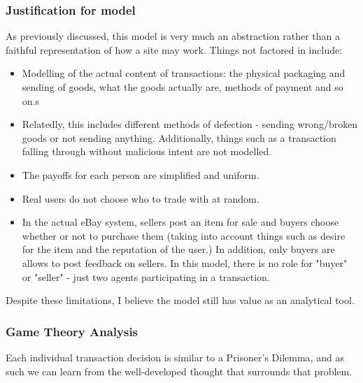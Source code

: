 \documentclass{article}
\begin{document}
\subsubsection{Justification for model}
\label{sec:justification-model}
As previously discussed, this model is very much an abstraction rather than a faithful representation of how a site may work. Things not factored in include:
\begin{itemize}
	\item Modelling of the actual content of transactions: the physical packaging and sending of goods, what the goods actually are, methods of payment and so on.s
	\item Relatedly, this includes different methods of defection - sending wrong/broken goods or not sending anything. Additionally, things such as a transaction falling through without malicious intent are not modelled.\cite{gregg2008typology}
	\item The payoffs for each person are simplified and uniform.
	\item Real users do not choose who to trade with at random.
	\item In the actual eBay system, sellers post an item for sale and buyers choose whether or not to purchase them (taking into account things such as desire for the item and the reputation of the user.) In addition, only buyers are allows to post feedback on sellers. In this model, there is no role for "buyer" or "seller" - just two agents participating in a transaction.
\end{itemize}

Despite these limitations, I believe the model still has value as an analytical tool.


\subsubsection{Game Theory Analysis}
\label{sec:game-theory}
Each individual transaction decision is similar to a Prisoner's Dilemma, and as such we can learn from the well-developed thought that surrounds that problem.
\end{document}
